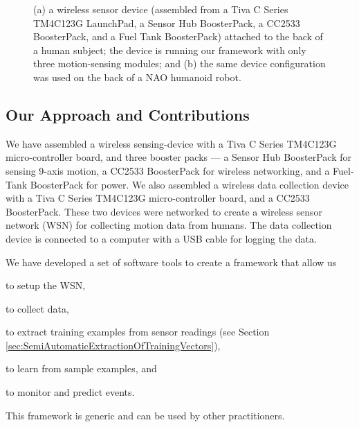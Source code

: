 \documentclass[]{IEEEtran}
\begin{document}
\begin{figure}[!tb]
\centering
{}
\qquad
{} 
\caption{(a) a wireless sensor device (assembled from a Tiva C Series  TM4C123G 
LaunchPad, a Sensor Hub BoosterPack, a CC2533 BoosterPack, and a Fuel Tank BoosterPack) 
attached to the back of a human subject; the device is running our framework  with only 
three motion-sensing modules; and (b) the 
same device configuration was used on the back of a NAO humanoid robot\cite{abeyruwanFlairs2015}.}
 \label{fig:deviceWithSubjects}
\end{figure}

\subsection{Our Approach and Contributions}

 
We have assembled a wireless sensing-device with a Tiva C Series TM4C123G
micro-controller board, and three booster packs --- a Sensor Hub BoosterPack  for
sensing 9-axis motion,  a CC2533  BoosterPack for wireless networking, and a
Fuel-Tank BoosterPack for power. We also assembled a wireless data collection
device with a Tiva C Series TM4C123G micro-controller board, and a  CC2533
BoosterPack. These two devices were networked to create a wireless sensor
network (WSN) for collecting motion data from  humans.  The data collection
device is connected to a computer with a USB cable for logging the data.   

We have developed a set of software tools to create a framework that allow us
\begin{inparaenum}[($i$)] \item  to setup the WSN, \item to collect data, \item
to extract training examples from sensor readings (see Section
\ref{sec:SemiAutomaticExtractionOfTrainingVectors}), \item to learn from sample
examples, and \item to monitor and predict events. \end{inparaenum} This
framework is generic and can be used by other practitioners.
\end{document}
